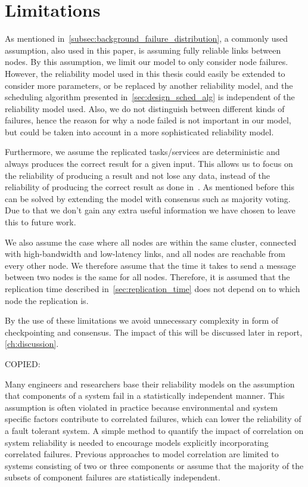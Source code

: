 \documentclass{cslthse-msc}
\begin{document}
\section{Limitations} \label{sec:design_limitations}
As mentioned in~\cref{subsec:background_failure_distribution}, a commonly used assumption, also used in this paper, is assuming fully reliable links between nodes. By this assumption, we limit our model to only consider node failures. However, the reliability model used in this thesis could easily be extended to consider more parameters, or be replaced by another reliability model, and the scheduling algorithm presented in~\cref{sec:design_sched_alg} is independent of the reliability model used. Also, we do not distinguish between different kinds of failures, hence the reason for why a node failed is not important in our model, but could be taken into account in a more sophisticated reliability model.

Furthermore, we assume the replicated tasks/services are deterministic and always produces the correct result for a given input. This allows us to focus on the reliability of producing a result and not lose any data, instead of the reliability of producing the correct result as done in~\cite{selfAdaptRel, dynAdaptRepl, relModelWebServices}. As mentioned before this can be solved by extending the model with consensus such as majority voting. Due to that we don't gain any extra useful information we have chosen to leave this to future work.

We also assume the case where all nodes are within the same cluster, connected with high-bandwidth and low-latency links, and all nodes are reachable from every other node. We therefore assume that the time it takes to send a message between two nodes is the same for all nodes. Therefore, it is assumed that the replication time described in~\cref{sec:replication_time} does not depend on to which node the replication is.

By the use of these limitations we avoid unnecessary complexity in form of checkpointing and consensus. The impact of this will be discussed later in report, \cref{ch:discussion}.

\iffalse
COPIED:

Many engineers and researchers base their reliability models on the assumption that components of a system fail in a statistically independent manner. This assumption is often violated in practice because environmental and system specific factors contribute to correlated failures, which can lower the reliability of a fault tolerant system. A simple method to quantify the impact of correlation on system reliability is needed to encourage models explicitly incorporating correlated failures. Previous approaches to model correlation are limited to systems consisting of two or three components or assume that the majority of the subsets of component failures are statistically independent. \cite{discContRelModel}
\end{document}
